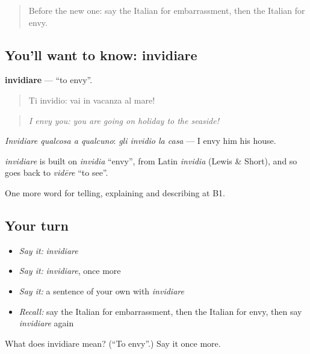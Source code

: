 \label{lesson:IT-C478-invidiare}



\begin{quote}
Before the new one: say the Italian for embarrassment, then the Italian for envy.
\end{quote}

\subsection*{You'll want to know: invidiare}
\textbf{invidiare} — \textquotedblleft{}to envy\textquotedblright{}.

\begin{quote}
Ti invidio: vai in vacanza al mare!
\end{quote}

\begin{quote}
\emph{I envy you: you are going on holiday to the seaside!}
\end{quote}

\emph{Invidiare qualcosa a qualcuno}: \emph{gli invidio la casa} — I envy him his house.

\begin{cousinweb}
\emph{invidiare} is built on \emph{invidia} \textquotedblleft{}envy\textquotedblright{}, from Latin \emph{invidia} (Lewis \& Short), and so goes back to \emph{vidēre} \textquotedblleft{}to see\textquotedblright{}.
\end{cousinweb}

\begin{grammarlens}[title={What you've built}]
One more word for telling, explaining and describing at B1.
\end{grammarlens}

\subsection*{Your turn}
\begin{itemize}
\raggedright
  \item \emph{Say it:} \emph{invidiare}
  \item \emph{Say it:} \emph{invidiare}, once more
  \item \emph{Say it:} a sentence of your own with \emph{invidiare}
  \item \emph{Recall:} say the Italian for embarrassment, then the Italian for envy, then say \emph{invidiare} again
\end{itemize}

\begin{tcolorbox}[breakable,colback=teal!4,colframe=teal!35!black,title={Before you move on}]
What does invidiare mean? (\textquotedblleft{}To envy\textquotedblright{}.) Say it once more.
\end{tcolorbox}
